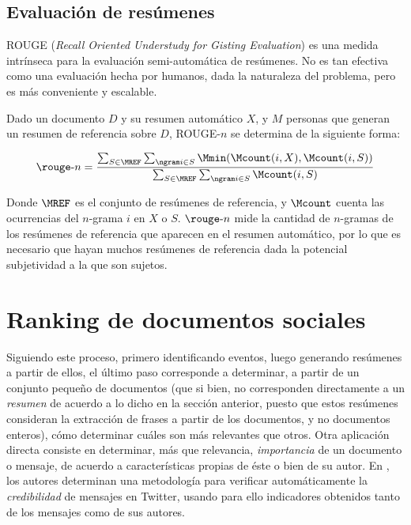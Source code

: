 \documentclass[upright, contnum]{umemoria}
\begin{document}
\subsection{Evaluación de resúmenes}
\label{sec-2.4.1}


    ROUGE (\emph{Recall Oriented Understudy for Gisting Evaluation})\cite{Lin:2003:AES:1073445.1073465}
    es una medida intrínseca para la evaluación semi-automática de
    resúmenes. No es tan efectiva como una evaluación hecha por
    humanos, dada la naturaleza del problema, pero es más conveniente
    y escalable.

    Dado un documento $D$ y su resumen automático $X$, y $M$ personas
    que generan un resumen de referencia sobre $D$, ROUGE-$n$ se
    determina de la siguiente forma:

    $$\rouge\text{-}n = \frac{  \sum_{S \in \MREF} \sum_{\ngram i \in S} \Mmin( \Mcount(i,X),\Mcount(i,S) )   }{ \sum_{S\in \MREF}\sum_{\ngram i \in S}  \Mcount(i,S) }$$

    Donde $\MREF$ es el conjunto de resúmenes de referencia, y
    $\Mcount$ cuenta las ocurrencias del $n$-grama $i$ en $X$ o
    $S$. $\rouge\text{-}n$ mide la cantidad de $n$-gramas de los
    resúmenes de referencia que aparecen en el resumen automático, por
    lo que es necesario que hayan muchos resúmenes de referencia dada
    la potencial subjetividad a la que son sujetos.

\section{Ranking de documentos sociales}
\label{sec-2.5}

   
   Siguiendo este proceso, primero identificando eventos, luego
   generando resúmenes a partir de ellos, el último paso corresponde a
   determinar, a partir de un conjunto pequeño de documentos (que si
   bien, no corresponden directamente a un \emph{resumen} de acuerdo a lo
   dicho en la sección anterior, puesto que estos resúmenes consideran
   la extracción de frases a partir de los documentos, y no documentos
   enteros), cómo determinar cuáles son más relevantes que otros. Otra
   aplicación directa consiste en determinar, más que relevancia,
   \emph{importancia} de un documento o mensaje, de acuerdo a
   características propias de éste o bien de su autor. En
   \cite{Castillo:2011:ICT:1963405.1963500}, los autores determinan
   una metodología para verificar automáticamente la \emph{credibilidad} de
   mensajes en Twitter, usando para ello indicadores obtenidos tanto
   de los mensajes como de sus autores.
\end{document}
